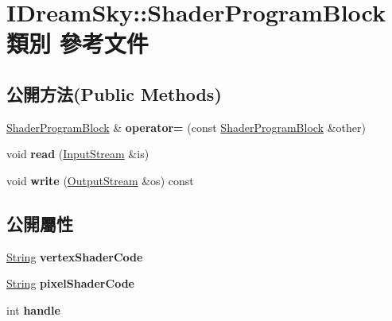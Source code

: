 \hypertarget{class_i_dream_sky_1_1_shader_program_block}{}\section{I\+Dream\+Sky\+:\+:Shader\+Program\+Block 類別 參考文件}
\label{class_i_dream_sky_1_1_shader_program_block}
\subsection*{公開方法(Public Methods)}
\begin{DoxyCompactItemize}
\item 
\hyperlink{class_i_dream_sky_1_1_shader_program_block}{Shader\+Program\+Block} \& {\bfseries operator=} (const \hyperlink{class_i_dream_sky_1_1_shader_program_block}{Shader\+Program\+Block} \&other)\hypertarget{class_i_dream_sky_1_1_shader_program_block_ac40958a4de45a615368a2a6d85576cd4}{}\label{class_i_dream_sky_1_1_shader_program_block_ac40958a4de45a615368a2a6d85576cd4}

\item 
void {\bfseries read} (\hyperlink{class_i_dream_sky_1_1_input_stream}{Input\+Stream} \&is)\hypertarget{class_i_dream_sky_1_1_shader_program_block_a51881b22a70ce5d4557433505ab433ca}{}\label{class_i_dream_sky_1_1_shader_program_block_a51881b22a70ce5d4557433505ab433ca}

\item 
void {\bfseries write} (\hyperlink{class_i_dream_sky_1_1_output_stream}{Output\+Stream} \&os) const \hypertarget{class_i_dream_sky_1_1_shader_program_block_afec3cdd0afefde397554bfb909bafc51}{}\label{class_i_dream_sky_1_1_shader_program_block_afec3cdd0afefde397554bfb909bafc51}

\end{DoxyCompactItemize}
\subsection*{公開屬性}
\begin{DoxyCompactItemize}
\item 
\hyperlink{class_i_dream_sky_1_1_string}{String} {\bfseries vertex\+Shader\+Code}\hypertarget{class_i_dream_sky_1_1_shader_program_block_ac4774db1c024a0bffcb653ae332b1140}{}\label{class_i_dream_sky_1_1_shader_program_block_ac4774db1c024a0bffcb653ae332b1140}

\item 
\hyperlink{class_i_dream_sky_1_1_string}{String} {\bfseries pixel\+Shader\+Code}\hypertarget{class_i_dream_sky_1_1_shader_program_block_a36d5ab40693b1083856ef1acbc6832c0}{}\label{class_i_dream_sky_1_1_shader_program_block_a36d5ab40693b1083856ef1acbc6832c0}

\item 
int {\bfseries handle}\hypertarget{class_i_dream_sky_1_1_shader_program_block_a9bd55263cd9c1f697dd5b876a08375fe}{}\label{class_i_dream_sky_1_1_shader_program_block_a9bd55263cd9c1f697dd5b876a08375fe}

\end{DoxyCompactItemize}


